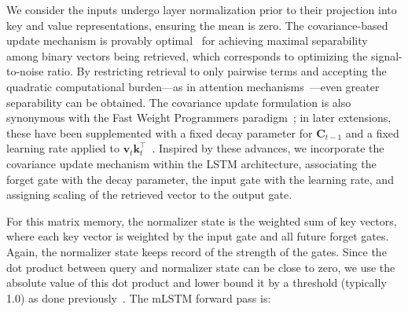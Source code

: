 We consider the inputs undergo layer normalization prior to their projection into key and value representations, ensuring the mean is zero. The covariance-based update mechanism is provably optimal~\citep{Dayan:91} for achieving maximal separability among binary vectors being retrieved, which corresponds to optimizing the signal-to-noise ratio. By restricting retrieval to only pairwise terms and accepting the quadratic computational burden—as in attention mechanisms~\citep{Krotov:16,Krotov:17,Ramsauer:21}—even greater separability can be obtained. The covariance update formulation is also synonymous with the Fast Weight Programmers paradigm~\citep{Schmidhuber:92ncfastweights,Schlag:21}; in later extensions, these have been supplemented with a fixed decay parameter for $\mathbf{C}_{t-1}$ and a fixed learning rate applied to $\mathbf{v}_{t} \mathbf{k}_t ^\top$~\citep{Ba:16}. Inspired by these advances, we incorporate the covariance update mechanism within the LSTM architecture, associating the forget gate with the decay parameter, the input gate with the learning rate, and assigning scaling of the retrieved vector to the output gate.

For this matrix memory, the normalizer state is the weighted sum of key vectors, where each key vector is weighted by the input gate and all future forget gates. Again, the normalizer state keeps record of the strength of the gates. Since the dot product between query and normalizer state can be close to zero, we use the absolute value of this dot product and lower bound it by a threshold (typically 1.0) as done previously~\citep{Sun:23arxiv}. The mLSTM forward pass is:

